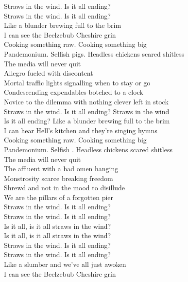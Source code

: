 Straws in the wind. Is it all ending? \\
Straws in the wind. Is it all ending? \\
Like a blunder brewing full to the brim \\
I can see the Beelzebub Cheshire grin \\

Cooking something raw. Cooking something big \\
Pandemonium. Selfish pigs. Headless chickens scared shitless \\
The media will never quit \\

Allegro fueled with discontent \\
Mortal traffic lights signalling when to stay or go \\
Condescending expendables botched to a clock \\
Novice to the dilemma with nothing clever left in stock \\

Straws in the wind. Is it all ending? Straws in the wind \\
Is it all ending? Like a blunder brewing full to the brim \\
I can hear Hell's kitchen and they're singing hymns \\

Cooking something raw. Cooking something big \\
Pandemonium. Selfish . Headless chickens scared shitless \\
The media will never quit \\

The affluent with a bad omen hanging \\
Monstrosity scarce breaking freedom \\
Shrewd and not in the mood to disillude \\
We are the pillars of a forgotten pier \\

Straws in the wind. Is it all ending? \\
Straws in the wind. Is it all ending? \\
Is it all, is it all straws in the wind? \\
Is it all, is it all straws in the wind? \\

Straws in the wind. Is it all ending? \\
Straws in the wind. Is it all ending? \\
Like a slumber and we've all just awoken \\
I can see the Beelzebub Cheshire grin \\

